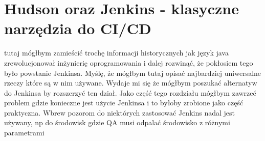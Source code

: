 \section{Hudson oraz Jenkins - klasyczne narzędzia do CI/CD}
tutaj mógłbym zamieścić trochę informacji historycznych jak język java zrewolucjonował inżynierię oprogramowania i dalej rozwinąć, że pokłosiem tego było powstanie Jenkinsa. Myślę, że mógłbym tutaj opisać najbardziej uniwersalne rzeczy które są w nim używane. Wydaje mi się że mógłbym poszukać alternatyw do Jenkinsa by rozszerzyć ten dział.
Jako część tego rozdziału mógłbym zawrzeć problem gdzie konieczne jest użycie Jenkinsa i to byłoby zrobione jako część praktyczna. Wbrew pozorom do niektórych zastosować Jenkins nadal jest używany, np do środowisk gdzie QA musi odpalać środowisko z różnymi parametrami